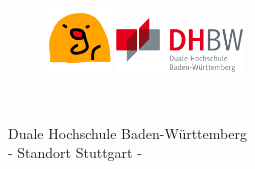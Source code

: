 


%


\thispagestyle{empty}


\begin{figure}[t]
 \centering
 \includegraphics[width=0.15\textwidth]{abb/app_icon}
 \includegraphics[width=0.3\textwidth]{abb/dhbw_logo}
\end{figure}


\begin{verbatim}


\end{verbatim}

\begin{center}
\Large{Duale Hochschule Baden-Württemberg}\\
\Large{- Standort Stuttgart -}\\
\end{center}


